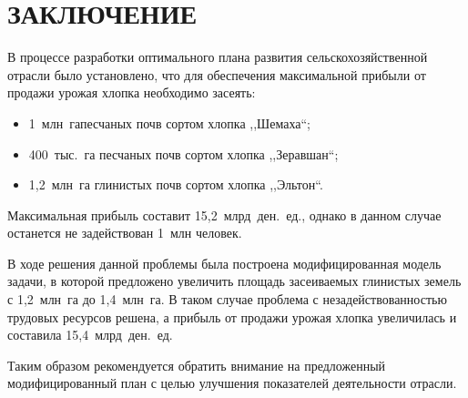 \section*{ЗАКЛЮЧЕНИЕ}

В процессе разработки оптимального плана развития сельскохозяйственной отрасли было установлено, что для обеспечения максимальной прибыли от продажи урожая хлопка необходимо засеять:
\begin{itemize}

\item  1~млн~гапесчаных почв сортом хлопка ,,Шемаха``;

\item  400~тыс.~га песчаных почв сортом хлопка ,,Зеравшан``;

\item  1,2~млн~га глинистых почв сортом хлопка ,,Эльтон``.

\end{itemize}

Максимальная прибыль составит 15,2~млрд~ден.~ед., однако в данном случае останется не задействован 1~млн человек.

В ходе решения данной проблемы была построена модифицированная модель задачи, в которой предложено увеличить площадь засеиваемых глинистых земель с 1,2~млн~га до 1,4~млн~га. В таком случае проблема с незадействованностью трудовых ресурсов решена, а прибыль от продажи урожая хлопка увеличилась и составила 15,4~млрд~ден.~ед.

Таким образом рекомендуется обратить внимание на предложенный модифицированный план с целью улучшения показателей деятельности отрасли.
\pagebreak